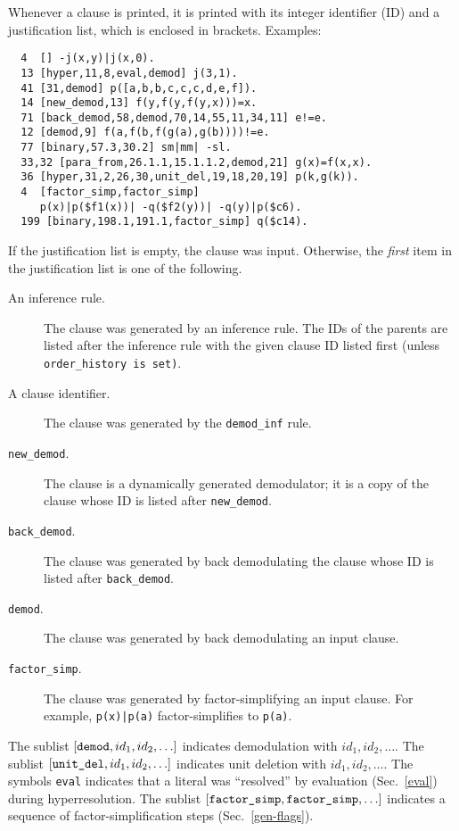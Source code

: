 \documentclass[11pt]{article}
\begin{document}
Whenever a clause is printed, it is printed with its integer
identifier (ID) and a justification list, which is enclosed in brackets.
Examples:

{\small
\begin{verbatim}
  4  [] -j(x,y)|j(x,0).
  13 [hyper,11,8,eval,demod] j(3,1).
  41 [31,demod] p([a,b,b,c,c,c,d,e,f]).
  14 [new_demod,13] f(y,f(y,f(y,x)))=x.
  71 [back_demod,58,demod,70,14,55,11,34,11] e!=e.
  12 [demod,9] f(a,f(b,f(g(a),g(b))))!=e.
  77 [binary,57.3,30.2] sm|mm| -sl.
  33,32 [para_from,26.1.1,15.1.1.2,demod,21] g(x)=f(x,x).
  36 [hyper,31,2,26,30,unit_del,19,18,20,19] p(k,g(k)).
  4  [factor_simp,factor_simp]
     p(x)|p($f1(x))| -q($f2(y))| -q(y)|p($c6).
  199 [binary,198.1,191.1,factor_simp] q($c14).
\end{verbatim}
}
\noindent
If the justification list is empty, the clause was input.
Otherwise, the {\em first} item in the justification list is 
one of the following.
\begin{description}
\item[An inference rule.]
The clause was generated by an inference rule.  The IDs of the parents
are listed after the inference rule with the given clause ID listed
first (unless \verb:order_history is set):.
\item[A clause identifier.]
The clause was generated by the \verb:demod_inf: rule.
\item[{\tt new\_demod}.]
The clause is a dynamically generated demodulator; it is a copy of the
clause whose ID is listed after \verb:new_demod:.
\item[{\tt back\_demod}.]
The clause was generated by back demodulating the clause
whose ID is listed after \verb:back_demod:.
\item[{\tt demod}.]
The clause was generated by back demodulating an input clause.
\item[{\tt factor\_simp}.]
The clause was generated by factor-simplifying an input clause.
For example, \verb:p(x)|p(a): factor-simplifies to \verb:p(a):.
\end{description}
The sublist $[\mbox{\tt demod}, id_1, id_2, \ldots]$ indicates
demodulation with $id_1, id_2, \ldots$.
The sublist $[\mbox{\tt unit\_del}, id_1, id_2, \ldots]$ indicates
unit deletion with $id_1, id_2, \ldots$.
The symbols \verb:eval: indicates that a literal was ``resolved'' by
evaluation (Sec.~\ref{eval}) during hyperresolution.
The sublist $[\mbox{\tt factor\_simp}, \mbox{\tt factor\_simp}, \ldots]$
indicates a sequence of factor-simplification steps (Sec.~\ref{gen-flags}).
\end{document}
